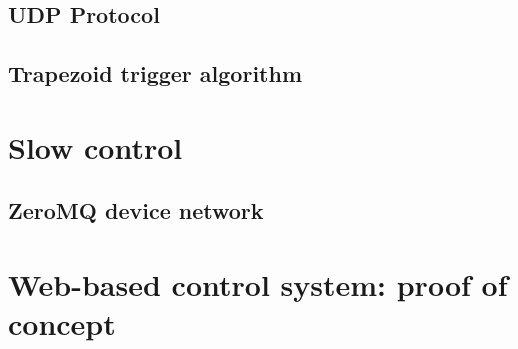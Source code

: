 

\subsection{UDP Protocol}



\subsection{Trapezoid trigger algorithm}




\section{Slow control}



\subsection{ZeroMQ device network}



\section{Web-based control system: proof of concept}


